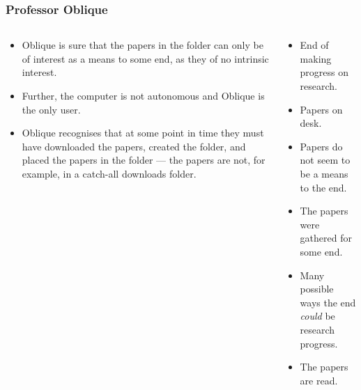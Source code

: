 \documentclass[noamssymb, compress, handout]{beamer} %
\begin{document}
\begin{frame}
  \frametitle{Professor Oblique}

  \begin{columns}[c]
    \begin{column}{0.6\textwidth}
      {\addtolength{\leftmargini}{-2\labelsep}
      \begin{itemize}
      \item<1-> Oblique is sure that the papers in the folder can only be of interest as a means to some end, as they of no intrinsic interest.
      \item<2-> Further, the computer is not autonomous and Oblique is the only user.
      \item<3-> Oblique recognises that at some point in time they must have downloaded the papers, created the folder, and placed the papers in the folder --- the papers are not, for example, in a catch-all downloads folder.
      \end{itemize}
      }
    \end{column}
    \vrule{}
    \begin{column}{0.3\textwidth}
      {
        \footnotesize
        \begin{itemize}
        \item End of making progress on research.
        \item Papers on desk.
        \item Papers do not seem to be a means to the end.
        \item<3-> The papers were gathered for some end.
        \item[] {\color{white} Many possible ways the end \emph{could} be research progress.}
        \item[] {\color{white} The papers are read.}
        \end{itemize}
      }
    \end{column}
  \end{columns}

\end{frame}
\end{document}
